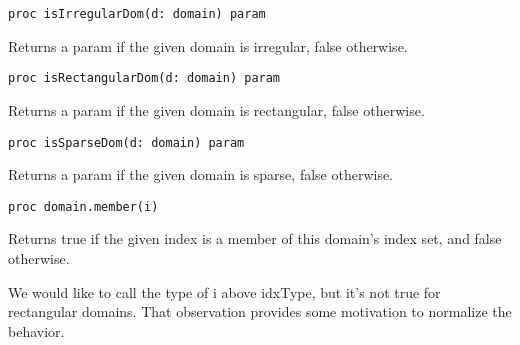\begin{protohead}
\begin{verbatim}
proc isIrregularDom(d: domain) param
\end{verbatim}
\end{protohead}
\begin{protobody}
Returns a param  if the given domain is irregular, false otherwise.
\end{protobody}

\begin{protohead}
\begin{verbatim}
proc isRectangularDom(d: domain) param
\end{verbatim}
\end{protohead}
\begin{protobody}
Returns a param  if the given domain is rectangular, false otherwise.
\end{protobody}

\begin{protohead}
\begin{verbatim}
proc isSparseDom(d: domain) param
\end{verbatim}
\end{protohead}
\begin{protobody}
Returns a param  if the given domain is sparse, false otherwise.
\end{protobody}

\begin{protohead}
\begin{verbatim}
proc domain.member(i)
\end{verbatim}
\end{protohead}
\begin{protobody}
Returns true if the given index  is a member of this domain's index set,
and false otherwise.
\end{protobody}

\begin{openissue}
We would like to call the type of i above idxType, but it's not true
for rectangular domains.  That observation provides some motivation to normalize
the behavior.
\end{openissue}

